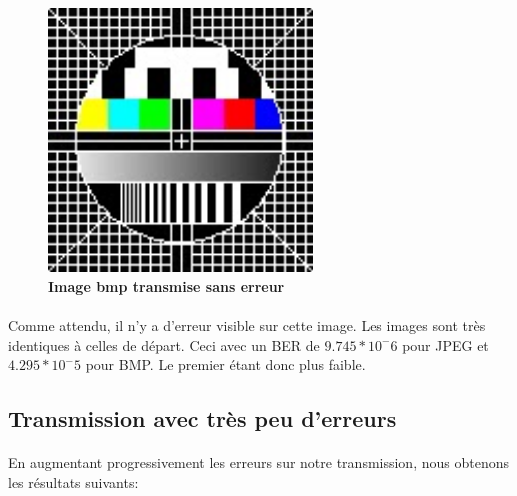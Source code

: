 \paragraph{}
\begin{figure}[bth]%
\begin{center}
\includegraphics[height=70mm,width=70mm]{BMP_test_bruit65dB}%
\caption{\textbf{Image bmp transmise sans erreur}}%
\label{bmpsserr}%
\end {center}
\end{figure}


\paragraph{}
Comme attendu, il n'y a d'erreur visible sur cette image. Les images sont très identiques à celles de départ. Ceci avec un BER de $9.745 * 10^ - ­6$ pour JPEG et $4.295 * 10^ - ­5$ pour BMP. Le premier étant donc plus faible.




\subsection{Transmission avec très peu d’erreurs}
\paragraph{}
En augmentant progressivement les erreurs sur notre transmission, nous obtenons les résultats suivants:



